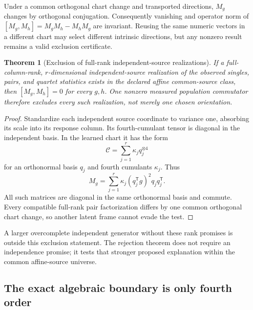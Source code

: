 \documentclass[11pt]{article}
\newtheorem{theorem}{Theorem}[section]
\theoremstyle{definition}
\theoremstyle{remark}
\newcommand{\trans}{\mathsf T}
\newcommand{\tensor}[2]{#1^{\otimes #2}}
\begin{document}
Under a common orthogonal chart change and transported directions,
$M_g$ changes by orthogonal conjugation. Consequently vanishing and
operator norm of $[M_g,M_h]=M_gM_h-M_hM_g$ are invariant. Reusing the
same numeric vectors in a different chart may select different intrinsic
directions, but any nonzero result remains a valid exclusion certificate.

\begin{theorem}[Exclusion of full-rank independent-source realizations]
\label{thm:exclusion}
If a full-column-rank, $r$-dimensional independent-source realization of
the observed singles, pairs, and quartet statistics exists in the declared
affine common-source class, then $[M_g,M_h]=0$ for every $g,h$.
One nonzero measured population commutator therefore excludes every
such realization, not merely one chosen orientation.
\end{theorem}
\begin{proof}
Standardize each independent source coordinate to variance one, absorbing
its scale into its response column. Its fourth-cumulant tensor is diagonal
in the independent basis. In the learned chart it has the form
\begin{equation}
\mathcal C=\sum_{j=1}^r\kappa_j\tensor{q_j}{4}
\label{eq:odeco-cumulant}
\end{equation}
for an orthonormal basis $q_j$ and fourth cumulants $\kappa_j$. Thus
\begin{equation}
M_g=\sum_{j=1}^r\kappa_j(q_j^\trans g)^2q_jq_j^\trans.
\label{eq:diagonal-contraction}
\end{equation}
All such matrices are diagonal in the same orthonormal basis and commute.
Every compatible full-rank pair factorization differs by one common
orthogonal chart change, so another latent frame cannot evade the test.
\end{proof}
A larger overcomplete independent generator without these rank promises
is outside this exclusion statement. The rejection theorem does not
require an independence promise; it tests that stronger proposed
explanation within the common affine-source universe.

\subsection{The exact algebraic boundary is only fourth order}
\end{document}
